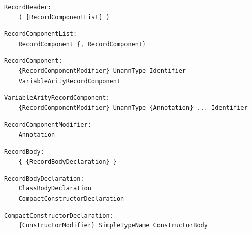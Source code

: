 \noindent\textbf{\texttt{}}\par
\begin{lstlisting}
RecordHeader:
    ( [RecordComponentList] )
\end{lstlisting}

\noindent\textbf{\texttt{}}\par
\begin{lstlisting}
RecordComponentList:
    RecordComponent {, RecordComponent}
\end{lstlisting}

\noindent\textbf{\texttt{}}\par
\begin{lstlisting}
RecordComponent:
    {RecordComponentModifier} UnannType Identifier
    VariableArityRecordComponent
\end{lstlisting}

\noindent\textbf{\texttt{}}\par
\begin{lstlisting}
VariableArityRecordComponent:
    {RecordComponentModifier} UnannType {Annotation} ... Identifier
\end{lstlisting}

\noindent\textbf{\texttt{}}\par
\begin{lstlisting}
RecordComponentModifier:
    Annotation
\end{lstlisting}

\noindent\textbf{\texttt{}}\par
\begin{lstlisting}
RecordBody:
    { {RecordBodyDeclaration} }
\end{lstlisting}

\noindent\textbf{\texttt{}}\par
\begin{lstlisting}
RecordBodyDeclaration:
    ClassBodyDeclaration
    CompactConstructorDeclaration
\end{lstlisting}

\noindent\textbf{\texttt{}}\par
\begin{lstlisting}
CompactConstructorDeclaration:
    {ConstructorModifier} SimpleTypeName ConstructorBody
\end{lstlisting}

